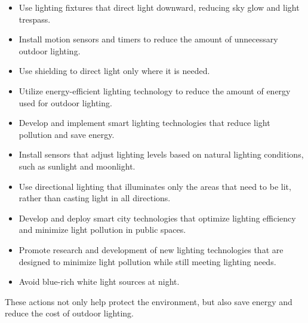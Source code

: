 \begin{itemize}
    \item Use lighting fixtures that direct light downward, reducing sky glow and light trespass.
    
    \item Install motion sensors and timers to reduce the amount of unnecessary outdoor lighting.
    
    \item Use shielding to direct light only where it is needed.
    
    \item Utilize energy-efficient lighting technology to reduce the amount of energy used for outdoor lighting.

    \item Develop and implement smart lighting technologies that reduce light pollution and save energy.
    
    \item Install sensors that adjust lighting levels based on natural lighting conditions, such as sunlight and moonlight.
    
    \item Use directional lighting that illuminates only the areas that need to be lit, rather than casting light in all directions.
    
    \item Develop and deploy smart city technologies that optimize lighting efficiency and minimize light pollution in public spaces.
    
    \item Promote research and development of new lighting technologies that are designed to minimize light pollution while still meeting lighting needs.

    \item Avoid blue-rich white light sources at night. 

\end{itemize}

These actions not only help protect the environment, but also save energy and reduce the cost of outdoor lighting.

